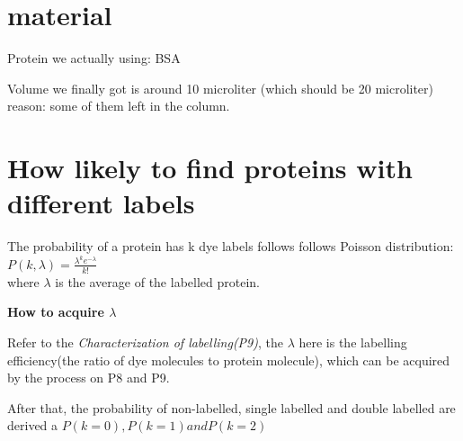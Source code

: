 \documentclass[12pt]{article}
\begin{document}
\section{material}
Protein we actually using: BSA

Volume we finally got is around 10 microliter (which should be 20 microliter)
reason: some of them left in the column.

\section{How likely to find proteins with different labels}
The probability of a protein has k dye labels follows follows Poisson distribution:\\

\(P(k,\lambda) = \frac{\lambda^k e^{-\lambda}}{k!}\)\\

where $\lambda$ is the average of the labelled protein.

\textbf{How to acquire $\lambda$}

Refer to the \textit{Characterization of labelling(P9)}, the $\lambda$ here is the labelling efficiency(the ratio of dye molecules to protein molecule), which can be acquired by the process on P8 and P9.

After that, the probability of non-labelled, single labelled and double labelled are derived a $P(k = 0), P(k = 1) and P( k = 2)$
\end{document}

